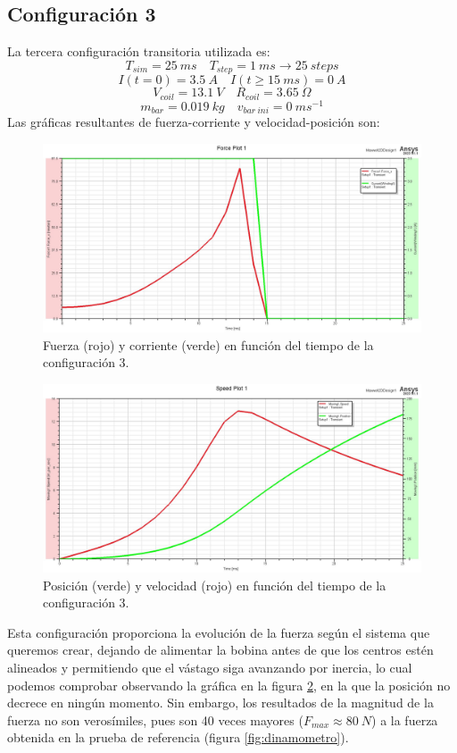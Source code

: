 \subsection*{Configuración 3}
La tercera configuración transitoria utilizada es:
\[
T_{sim}=25~ms \quad T_{step}=1~ms \to 25~steps
\]
\[
I(t=0)=3.5~A \quad I(t\geq 15~ms)=0~A
\]
\[
V_{coil}=13.1~V \quad R_{coil}=3.65~\Omega
\]
\[
m_{bar}=0.019~kg \quad v_{bar~ini}=0~ms^{-1}
\]
Las gráficas resultantes de fuerza-corriente y velocidad-posición son:
\begin{figure}[H]
    \centering
    \includegraphics[width=13cm]{FigurasMemoria/S3ForceCurrent.jpg}
    \caption{Fuerza (rojo) y corriente (verde) en función del tiempo de la configuración 3.}
    \label{fig:S3ForceCurrent} %
\end{figure}
\begin{figure}[H]
    \centering
    \includegraphics[width=13cm]{FigurasMemoria/S3SpeedPos.jpg}
    \caption{Posición (verde) y velocidad (rojo) en función del tiempo de la configuración 3.}
    \label{fig:S3SpeedPos} %
\end{figure}

Esta configuración proporciona la evolución de la fuerza según el sistema que queremos crear, dejando de alimentar la bobina antes de que los centros estén alineados y permitiendo que el vástago siga avanzando por inercia, lo cual podemos comprobar observando la gráfica en la figura \ref{fig:S3SpeedPos}, en la que la posición no decrece en ningún momento. Sin embargo, los resultados de la magnitud de la fuerza no son verosímiles, pues son 40 veces mayores (\(F_{max}\approx 80~N\)) a la fuerza obtenida en la prueba de referencia (figura \ref{fig:dinamometro}).

